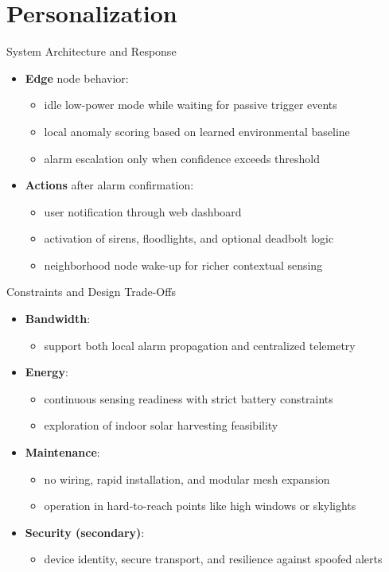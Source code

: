 \section{Personalization}

\footlinecolor{}
\begin{frame}{System Architecture and Response}
\begin{itemize}
\item \textbf{Edge} node behavior:
      \begin{itemize}
      \item idle low-power mode while waiting for passive trigger events
      \item local anomaly scoring based on learned environmental baseline
      \item alarm escalation only when confidence exceeds threshold
      \end{itemize}
\item \textbf{Actions} after alarm confirmation:
      \begin{itemize}
      \item user notification through web dashboard
      \item activation of sirens, floodlights, and optional deadbolt logic
      \item neighborhood node wake-up for richer contextual sensing
      \end{itemize}
\end{itemize}
\end{frame}

\footlinecolor{}
\begin{frame}{Constraints and Design Trade-Offs}
\begin{itemize}
\item \textbf{Bandwidth}:
      \begin{itemize}
      \item support both local alarm propagation and centralized telemetry
      \end{itemize}
\item \textbf{Energy}:
  \begin{itemize}
  \item continuous sensing readiness with strict battery constraints
  \item exploration of indoor solar harvesting feasibility
  \end{itemize}
\item \textbf{Maintenance}:
  \begin{itemize}
  \item no wiring, rapid installation, and modular mesh expansion
  \item operation in hard-to-reach points like high windows or skylights
      \end{itemize}
\item \textbf{Security (secondary)}:
      \begin{itemize}
      \item device identity, secure transport, and resilience against spoofed alerts
      \end{itemize}
\end{itemize}
\end{frame}
